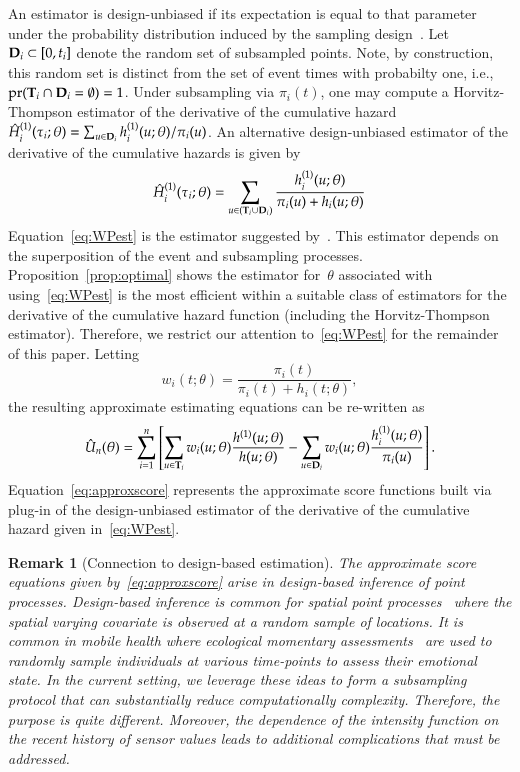 \documentclass[12pt]{amsart}
\def\pr{\mathop{\text{pr}}\nolimits}
\def\pr{\mathop{\text{pr}}\nolimits}
\newtheorem{rmk}[thm]{Remark}%
\def\bfT{{\bf T}}
\def\bfD{{\bf D}}
\begin{document}
An estimator is design-unbiased if its expectation is equal to that parameter under the probability distribution induced by the sampling design~\citep{Cassel1977}. Let~$\bfD_i \subset [0,t_i]$ denote the random set of subsampled points.  Note, by construction, this random set is distinct from the set of event times with probabilty one, i.e.,~$\pr( \bfT_i \cap \bfD_i = \emptyset) = 1$.  Under subsampling via $\pi_i (t)$, one may compute a Horvitz-Thompson estimator of the derivative of the cumulative hazard $\hat H_{i}^{(1)} (\tau_i; \theta) = \sum_{u \in \bfD_i} h^{(1)}_i (u; \theta)/\pi_i (u)$. An alternative design-unbiased estimator of the derivative of the cumulative hazards is given by
\begin{equation}
\label{eq:WPest}
\hat H_{i}^{(1)} (\tau_i; \theta) = \sum_{u \in (\bfT_i \cup \bfD_i)}
\frac{ h^{(1)}_i ( u; \theta ) }{ \pi_i (u) + h_i ( u ; \theta) }
\end{equation}
Equation~\eqref{eq:WPest} is the estimator suggested by~\cite{Waagepetersen2008}.  This estimator depends on the superposition of the event and subsampling processes. Proposition~\ref{prop:optimal} shows the estimator for~$\theta$ associated with using~\eqref{eq:WPest} is the most efficient within a suitable class of estimators for the derivative of the cumulative hazard function (including the Horvitz-Thompson estimator). Therefore, we restrict our attention to~\eqref{eq:WPest} for the remainder of this paper. Letting
\begin{equation}
\label{eq:waage_weights}
w_i (t; \theta) = \frac{\pi_i (t)}{\pi_i (t) + h_i (t ; \theta)},
\end{equation}
the resulting approximate estimating equations can be re-written as
\begin{equation}
\label{eq:approxscore}
\hat{U}_n (\theta) = \sum_{i=1}^n \left[ \sum_{u \in \bfT_i} w_i(u; \theta)
  \frac{h^{(1)} (u; \theta)}{ h ( u; \theta)}  - \sum_{u \in \bfD_i} w_i(u;
  \theta) \frac{h_i^{(1)} (u; \theta)}{ \pi_i (u) } \right].
\end{equation}
Equation~\eqref{eq:approxscore} represents the approximate score functions built via plug-in of the design-unbiased estimator of the derivative of the cumulative hazard given in~\eqref{eq:WPest}.

\begin{rmk}[Connection to design-based estimation]
The approximate score equations given by~\eqref{eq:approxscore} arise in design-based inference of point processes.  Design-based inference is common for spatial point processes~\citep{Waagepetersen2008} where the spatial varying covariate is observed at a random sample of locations. It is common in mobile health where ecological momentary assessments~\citep{Rathbun2012,Rathbun2016} are used to randomly sample individuals at various time-points to assess their emotional state.  In the current setting, we leverage these ideas to form a subsampling protocol that can substantially reduce computationally complexity.  Therefore, the purpose is quite different. Moreover, the dependence of the intensity function on the recent history of sensor values leads to additional complications that must be addressed.
\end{rmk}
\end{document}
